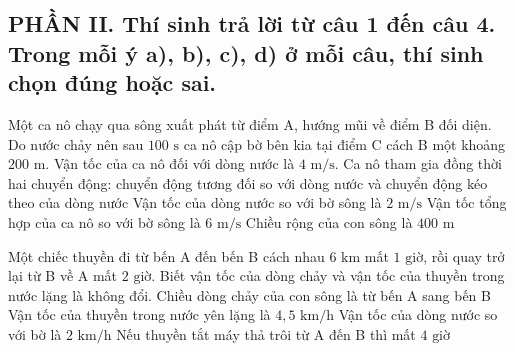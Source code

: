 \subsection*{PHẦN II. Thí sinh trả lời từ câu 1 đến câu 4. Trong mỗi ý a), b), c), d) ở mỗi câu, thí sinh chọn đúng hoặc sai.}

\begin{ex}
Một ca nô chạy qua sông xuất phát từ điểm A, hướng mũi về điểm B đối diện. Do nước chảy nên sau $100\text{ s}$ ca nô cập bờ bên kia tại điểm C cách B một khoảng $200\text{ m}$. Vận tốc của ca nô đối với dòng nước là $4\text{ m/s}$.
\choiceTF
{\True Ca nô tham gia đồng thời hai chuyển động: chuyển động tương đối so với dòng nước và chuyển động kéo theo của dòng nước}
{\True Vận tốc của dòng nước so với bờ sông là $2\text{ m/s}$}
{Vận tốc tổng hợp của ca nô so với bờ sông là $6\text{ m/s}$}
{\True Chiều rộng của con sông là $400\text{ m}$}
\end{ex}

\begin{ex}
Một chiếc thuyền đi từ bến A đến bến B cách nhau $6\text{ km}$ mất $1\text{ giờ}$, rồi quay trở lại từ B về A mất $2\text{ giờ}$. Biết vận tốc của dòng chảy và vận tốc của thuyền trong nước lặng là không đổi.
\choiceTF
{\True Chiều dòng chảy của con sông là từ bến A sang bến B}
{\True Vận tốc của thuyền trong nước yên lặng là $4{,}5\text{ km/h}$}
{Vận tốc của dòng nước so với bờ là $2\text{ km/h}$}
{\True Nếu thuyền tắt máy thả trôi từ A đến B thì mất $4\text{ giờ}$}
\end{ex}

